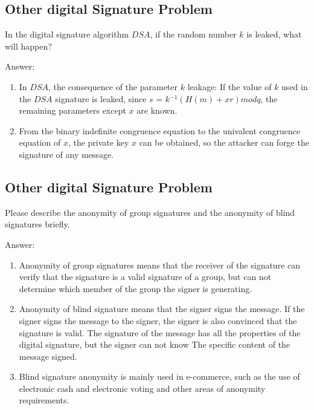 \documentclass[paper=a4, fontsize=11pt]{scrartcl} %
\numberwithin{equation}{section} %
\numberwithin{figure}{section} %
\numberwithin{table}{section} %
\begin{document}
\subsection{Other digital Signature Problem \uppercase\expandafter{}}

In the digital signature algorithm $DSA$, if the random number $k$ is leaked, what will happen?

Answer:
\begin{enumerate}
\item In $DSA$, the consequence of the parameter $k$ leakage: If the value of $k$ used in the $DSA$ signature is leaked, since $s$ = $k$$^{-1}(H(m)+xr) mod q$, the remaining parameters except $x$ are known.
\item From the binary indefinite congruence equation to the univalent congruence equation of $x$, the private key $x$ can be obtained, so the attacker can forge the signature of any message.
\end{enumerate}


\subsection{Other digital Signature Problem \uppercase\expandafter{}}

Please describe the anonymity of group signatures and the anonymity of blind signatures briefly.

Answer:
\begin{enumerate}
\item Anonymity of group signatures means that the receiver of the signature can verify that the signature is a valid signature of a group, but can not determine which member of the group the signer is generating.
\item Anonymity of blind signature means that the signer signs the message. If the signer signs the message to the signer, the signer is also convinced that the signature is valid. The signature of the message has all the properties of the digital signature, but the signer can not know The specific content of the message signed.
\item Blind signature anonymity is mainly used in e-commerce, such as the use of electronic cash and electronic voting and other areas of anonymity requirements.
\end{enumerate}
\end{document}

